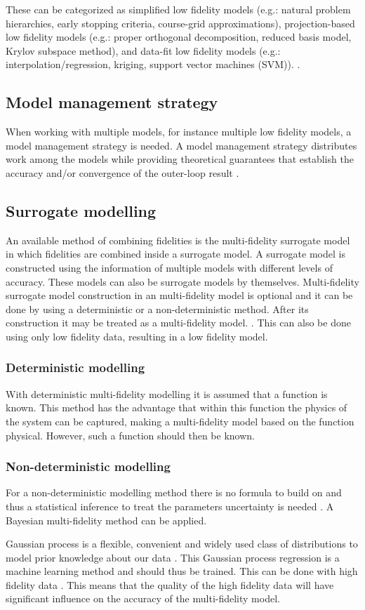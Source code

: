 These can be categorized as simplified low fidelity models (e.g.: natural problem hierarchies, early stopping criteria, course-grid approximations), projection-based low fidelity models (e.g.: proper orthogonal decomposition, reduced basis model, Krylov subspace method), and data-fit low fidelity models (e.g.: interpolation/regression, kriging, support vector machines (SVM)). \cite{Peherstorfer2018}. 
\subsection{Model management strategy}
\label{sec:lit_mfm_mms}
When working with multiple models, for instance multiple low fidelity models, a model management strategy is needed. A model management strategy distributes work among the models while providing theoretical guarantees that establish the accuracy and/or convergence of the outer-loop result \cite{Peherstorfer2018}.


\subsection{Surrogate modelling}
\label{sec:lit_mfm_sm}
An available method of combining fidelities is the multi-fidelity surrogate model in which fidelities are combined inside a surrogate model. A surrogate model is constructed using the
information of multiple models with different levels of accuracy. These models can also be surrogate models by themselves. Multi-fidelity surrogate model construction in an multi-fidelity model is optional and it can be done by using a deterministic or a non-deterministic method. After its construction it may be treated as a multi-fidelity model. \cite{Fernandez-Godino2016}. This can also be done using only low fidelity data, resulting in a low fidelity model.

\subsubsection{Deterministic modelling}
\label{sec:lit_mfm_dm}
With deterministic multi-fidelity modelling it is assumed that a function is known. This method has the advantage that within this function the physics of the system can be captured, making a multi-fidelity model based on the function physical. However, such a function should then be known. 

\subsubsection{Non-deterministic modelling}
\label{sec:lit_mfm_ndm}
For a non-deterministic modelling method there is no formula to build on and thus a statistical inference to treat the parameters uncertainty is needed \cite{Fernandez-Godino2016}. A Bayesian multi-fidelity method can be applied. \par 
Gaussian process is a flexible, convenient and widely used class of distributions to model prior knowledge about our data \cite{Fernandez-Godino2016}. This Gaussian process regression is a machine learning method and should thus be trained. This can be done with high fidelity data \cite{Bonfiglio2018b}. This means that the quality of the high fidelity data will have significant influence on the accuracy of the multi-fidelity model.
